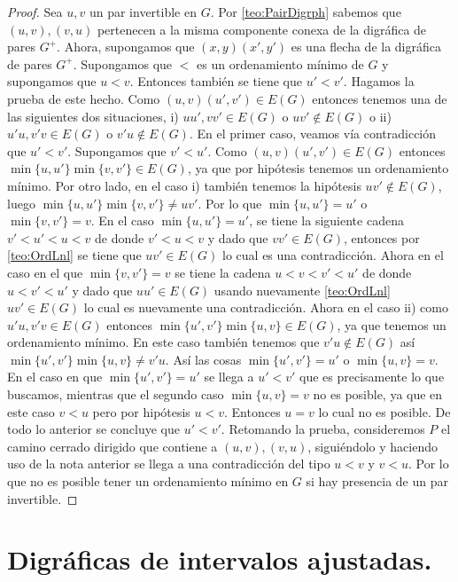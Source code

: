 \begin{proof}
    Sea $u,v$ un {\color{malva} par invertible} en $G$. Por \cref{teo:PairDigrph} sabemos que $(u,v),(v,u)$ pertenecen a la misma componente conexa de la digráfica de pares $G^+$. 
    Ahora, supongamos que $(x,y)(x', y')$ es una flecha de la digráfica de pares $G^+$. Supongamos que $<$ es un ordenamiento mínimo de $G$ y supongamos que $ u < v$. Entonces también se tiene que $u'< v'$. Hagamos la prueba de este hecho. Como $(u,v)(u',v')\in E(G)$ entonces tenemos una de las siguientes dos situaciones, i) $uu', vv'\in E(G)$ o $uv'\notin E(G) $ o ii) $u'u, v'v \in E(G)$ o $ v'u \notin E(G) $. En el primer caso, veamos vía contradicción que $u'<v'$.  Supongamos que $v'<u'$. Como $(u,v)(u',v')\in E(G)$ entonces $\min \{u,u' \}\min \{v,v' \}\in E(G)$, ya que por hipótesis tenemos un ordenamiento mínimo. Por otro lado, en el caso i) también tenemos la hipótesis $uv'\notin E(G)$, luego $\min \{u,u' \}\min \{v,v' \} \neq uv'$. Por lo que $\min \{u,u' \}=u'$ o $\min \{v,v' \}= v$. En el caso $\min \{u,u' \}=u'$, se tiene la siguiente cadena $v'<u'<u<v$ de donde $v'<u<v$ y dado que $vv'\in E(G)$, entonces por \cref{teo:OrdLnl} se tiene que $uv'\in E(G)$ lo cual es una contradicción. Ahora en el caso en el que $\min \{v,v' \}= v$ se tiene la cadena $u<v<v'<u'$ de donde $u<v'<u'$ y dado que $uu'\in E(G)$ usando nuevamente \cref{teo:OrdLnl} $uv' \in E(G)$ lo cual es nuevamente una contradicción. Ahora en el caso ii) como $u'u, v'v \in E(G)$ entonces $\min \{u',v' \}\min \{u,v \}\in E(G)$, ya que tenemos un ordenamiento mínimo. En este caso también tenemos que $v'u\notin E(G)$ así $\min \{u',v' \}  \min \{u,v \}\neq v'u$. Así las cosas $\min \{u',v' \}=u'$ o $\min \{u,v \}=v$. En el caso en que $\min \{u',v' \}=u'$ se llega a $u'<v'$ que es precisamente lo que buscamos, mientras que el segundo caso $\min \{u,v \}=v$ no es posible, ya que en este caso $v<u$ pero por hipótesis $u<v$. Entonces $u = v$ lo cual no es posible. De todo lo anterior se concluye que $u'<v'$.    
    Retomando la prueba, consideremos $P$ el camino cerrado dirigido que contiene a $(u,v),(v,u)$, siguiéndolo y haciendo uso de la nota anterior se llega a una contradicción del tipo $u<v$ y $v<u$.
    Por lo que no es posible tener un ordenamiento mínimo en $G$ si hay presencia de un par invertible.
\end{proof}

\section{Digráficas de intervalos ajustadas.}

